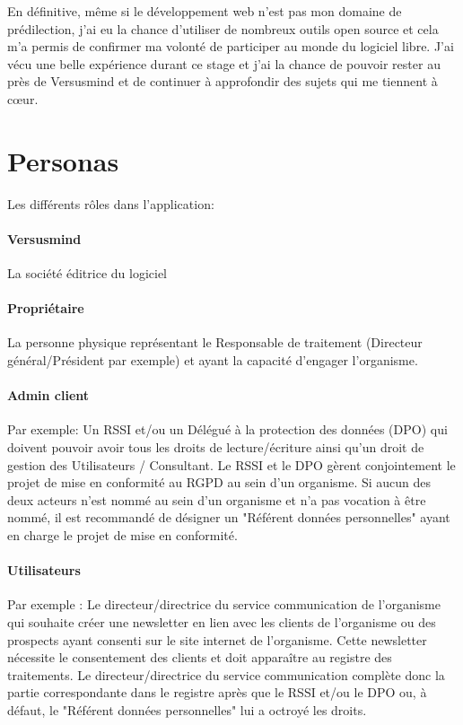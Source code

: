 \documentclass[12pt, a4paper]{report}
\begin{document}
En définitive, même si le développement web n'est pas mon domaine de prédilection, j'ai eu la chance d'utiliser de nombreux outils open source et cela m'a permis de confirmer ma volonté de participer au monde du logiciel libre.
J'ai vécu une belle expérience durant ce stage et j'ai la chance de pouvoir rester au près de Versusmind et de continuer à approfondir des sujets qui me tiennent à cœur.

\appendix
\chapter{Personas}
Les différents rôles dans l'application:

\subsubsection{Versusmind}
La société éditrice du logiciel

\subsubsection{Propriétaire}

La personne physique représentant le Responsable de traitement (Directeur général/Président par exemple) et ayant la capacité d'engager l'organisme.

\subsubsection{Admin client}
Par exemple: Un RSSI et/ou un Délégué à la protection des données (DPO) qui doivent pouvoir avoir tous les droits de lecture/écriture ainsi qu'un droit de gestion des Utilisateurs / Consultant.\newline
Le RSSI et le DPO gèrent conjointement le projet de mise en conformité au RGPD au sein d'un organisme.\newline
Si aucun des deux acteurs n'est nommé au sein d'un organisme et n'a pas vocation à être nommé, il est recommandé de désigner un "Référent données personnelles" ayant en charge le projet de mise en conformité.\newpage

\subsubsection{Utilisateurs}
Par exemple : Le directeur/directrice du service communication de l'organisme qui souhaite créer une newsletter en lien avec les clients de l'organisme ou des prospects ayant consenti sur le site internet de l'organisme.\newline
Cette newsletter nécessite le consentement des clients et doit apparaître au registre des traitements.\newline
Le directeur/directrice du service communication complète donc la partie correspondante dans le registre après que le RSSI et/ou le DPO ou, à défaut, le "Référent données personnelles" lui a octroyé les droits.
\end{document}
